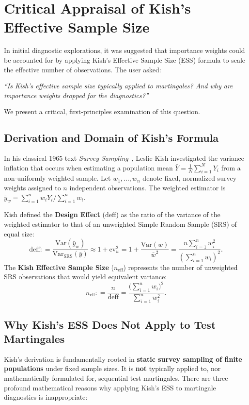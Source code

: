 \documentclass[11pt,a4paper]{article}
\newcommand{\coloneqq}{\mathrel{\mathop:}=}
\begin{document}
\newpage
\section{Critical Appraisal of Kish's Effective Sample Size}

In initial diagnostic explorations, it was suggested that importance weights could be accounted for by applying Kish's Effective Sample Size (ESS) formula to scale the effective number of observations. The user asked:
\begin{center}
\emph{``Is Kish's effective sample size typically applied to martingales? And why are importance weights dropped for the diagnostics?''}
\end{center}

We present a critical, first-principles examination of this question.

\subsection{Derivation and Domain of Kish's Formula}
In his classical 1965 text \emph{Survey Sampling}~\cite{kish1965survey}, Leslie Kish investigated the variance inflation that occurs when estimating a population mean $\bar{Y} = \frac{1}{N}\sum_{i=1}^N Y_i$ from a non-uniformly weighted sample. Let $w_1, \dots, w_n$ denote fixed, normalized survey weights assigned to $n$ independent observations. The weighted estimator is $\bar{y}_w = \sum_{i=1}^n w_i Y_i / \sum_{i=1}^n w_i$.

Kish defined the \textbf{Design Effect} ($\text{deff}$) as the ratio of the variance of the weighted estimator to that of an unweighted Simple Random Sample (SRS) of equal size:
\begin{equation}\label{eq:kish_deff}
\text{deff} \coloneqq \frac{\text{Var}(\bar{y}_w)}{\text{Var}_{\text{SRS}}(\bar{y})} \approx 1 + \text{cv}_w^2 = 1 + \frac{\text{Var}(w)}{\bar{w}^2} = \frac{n \sum_{i=1}^n w_i^2}{(\sum_{i=1}^n w_i)^2}.
\end{equation}
The \textbf{Kish Effective Sample Size} ($n_{\text{eff}}$) represents the number of unweighted SRS observations that would yield equivalent variance:
\begin{equation}\label{eq:kish_ess}
n_{\text{eff}} \coloneqq \frac{n}{\text{deff}} = \frac{\big(\sum_{i=1}^n w_i\big)^2}{\sum_{i=1}^n w_i^2}.
\end{equation}

\subsection{Why Kish's ESS Does Not Apply to Test Martingales}
Kish's derivation is fundamentally rooted in \textbf{static survey sampling of finite populations} under fixed sample sizes. It is \textbf{not} typically applied to, nor mathematically formulated for, sequential test martingales. There are three profound mathematical reasons why applying Kish's ESS to martingale diagnostics is inappropriate:
\end{document}
